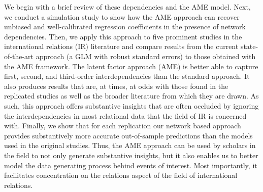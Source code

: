 We begin with a brief review of these dependencies and the AME model. Next, we conduct a simulation study to show how the AME approach can recover unbiased and well-calibrated regression coefficients in the presence of network dependencies. Then, we apply this approach to five prominent studies in the international relations (IR) literature and compare results from the current state-of-the-art approach (a GLM with robust standard errors) to those obtained with the AME framework. The latent factor approach (AME) is better able to capture first, second, and third-order interdependencies than the standard approach. It also produces results that are, at times, at odds with those found in the replicated studies as well as the broader literature from which they are drawn. As such, this approach offers substantive insights that are often occluded by ignoring the interdependencies in most relational data that the field of IR is concerned with. Finally, we show that for each replication our network based approach provides substantively more accurate out-of-sample predictions than the models used in the original studies. Thus, the AME approach can be used by scholars in the field to not only generate substantive insights, but it also enables us to better model the data generating process behind events of interest.  Most importantly, it facilitates concentration on the relations aspect of the field of international relations.